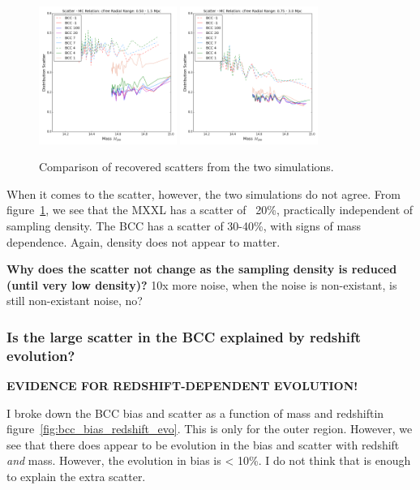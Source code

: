 \documentclass[11pt]{article}
\begin{document}
\begin{figure} \centering
\includegraphics[width=0.4\textwidth]{figures/density_cfree-r5_scatter}
\includegraphics[width=0.4\textwidth]{figures/density_cfree-r10_scatter}
\caption{Comparison of recovered scatters from the two simulations.}
\label{fig:bcc_vs_mxxl_density_scatter}
\end{figure}

When it comes to the scatter, however, the two simulations do not agree. From figure~\ref{fig:bcc_vs_mxxl_density_scatter}, we see that the MXXL has a scatter of ~20\%, practically independent of sampling density. The BCC has a scatter of 30-40\%, with signs of mass dependence. Again, density does not appear to matter. 

\textbf{Why does the scatter not change as the sampling density is reduced (until very low density)?}
10x more noise, when the noise is non-existant, is still non-existant noise, no?

\subsubsection{Is the large scatter in the BCC explained by redshift evolution?}

\textbf{EVIDENCE FOR REDSHIFT-DEPENDENT EVOLUTION!}

I broke down the BCC bias and scatter as a function of mass and redshiftin figure~\ref{fig:bcc_bias_redshift_evo}. This is only for the outer region. However, we see that there does appear to be evolution in the bias and scatter with redshift \emph{and} mass. However, the evolution in bias is < 10\%. I do not think that is enough to explain the extra scatter.
\end{document}
